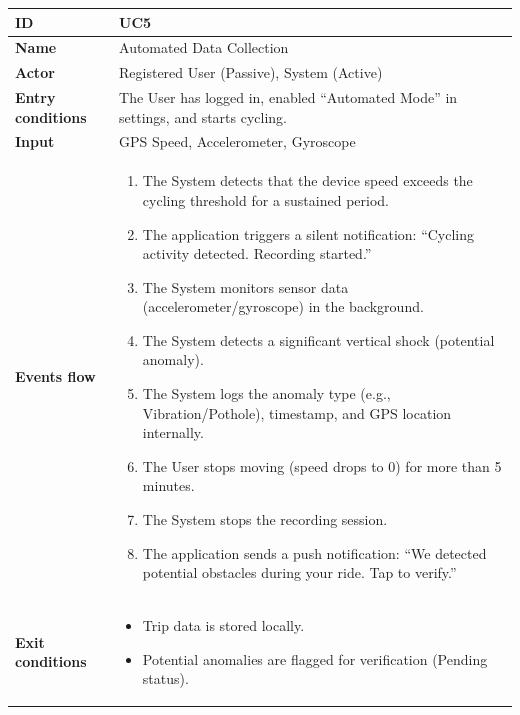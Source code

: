 \begin{table}[H]
\centering
\begin{tabularx}{\textwidth}{|m{3.5cm}|X|}
\hline
\textbf{ID} & UC5 \\ \hline
\textbf{Name} & Automated Data Collection \\ \hline
\textbf{Actor} & Registered User (Passive), System (Active) \\ \hline
\textbf{Entry conditions} & The User has logged in, enabled ``Automated Mode'' in settings, and starts cycling. \\ \hline
\textbf{Input} & GPS Speed, Accelerometer, Gyroscope \\ \hline
\textbf{Events flow} & 
    \begin{enumerate}[nosep, leftmargin=*, before=\vspace{0.3em}, after=\vspace{0.3em}]
        \item The System detects that the device speed exceeds the cycling threshold for a sustained period.
        \item The application triggers a silent notification: ``Cycling activity detected. Recording started.''
        \item The System monitors sensor data (accelerometer/gyroscope) in the background.
        \item The System detects a significant vertical shock (potential anomaly).
        \item The System logs the anomaly type (e.g., Vibration/Pothole), timestamp, and GPS location internally.
        \item The User stops moving (speed drops to 0) for more than 5 minutes.
        \item The System stops the recording session.
        \item The application sends a push notification: ``We detected potential obstacles during your ride. Tap to verify.''
    \end{enumerate} 
    \\ \hline
\textbf{Exit conditions} & 
    \begin{itemize}[nosep, leftmargin=*, before=\vspace{0.3em}, after=\vspace{0.3em}]
        \item Trip data is stored locally.
        \item Potential anomalies are flagged for verification (Pending status).
    \end{itemize}

\end{tabularx}
\end{table}

